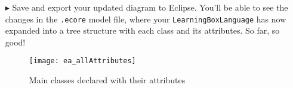 \begin{itemize}
\vspace{0.5cm}

\item[$\blacktriangleright$] Save and export your updated diagram to Eclipse. You'll be able to see the changes in the \texttt{.ecore} model file, where
your \texttt{LearningBoxLanguage} has now expanded into a tree structure with each class and its attributes. So far, so good!

\newpage

\vspace*{3cm}


\begin{figure}[htbp]
	\centering
  \texttt{[image: ea\_allAttributes]}
	\caption{Main classes declared with their attributes}
	\label{fig:attribute_completed}
\end{figure}
\FloatBarrier

\end{itemize}
